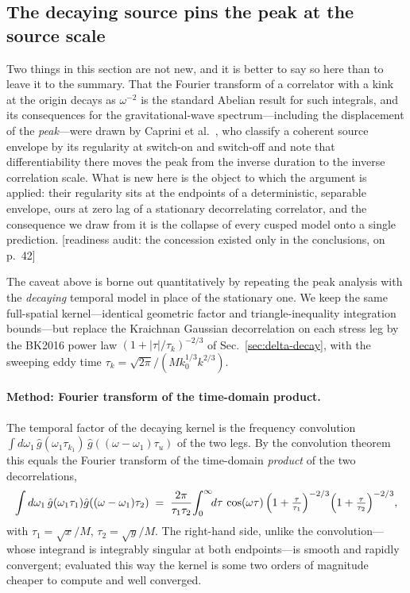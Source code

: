 \documentclass[10pt,prd,aps,nobibnotes,superscriptaddress,preprintnumbers,notitlepage]{revtex4-1}
\newcommand{\add}[1]{{\color{red}#1}}
\newcommand{\why}[1]{{\color{red}\footnotesize\textsf{[#1]}}}
\newcommand{\add}[1]{#1}
\newcommand{\why}[1]{}
\begin{document}
\subsection{The decaying source pins the peak at the source scale}
\label{sec:decaying-peak}

\add{Two things in this section are not new, and it is better to say so here than to
leave it to the summary. That the Fourier transform of a correlator with a kink at the
origin decays as $\omega^{-2}$ is the standard Abelian result for such integrals, and
its consequences for the gravitational-wave spectrum---including the displacement of the
\emph{peak}---were drawn by Caprini et al.~\cite{Caprini:2009fx}, who classify a
coherent source envelope by its regularity at switch-on and switch-off and note that
differentiability there moves the peak from the inverse duration to the inverse
correlation scale. What is new here is the object to which the argument is applied: their
regularity sits at the endpoints of a deterministic, separable envelope, ours at zero lag
of a stationary decorrelating correlator, and the consequence we draw from it is the
collapse of every cusped model onto a single prediction.}
\why{readiness audit: the concession existed only in the conclusions, on p.~42}

The caveat above is borne out quantitatively by repeating the peak analysis with
the \emph{decaying} temporal model in place of the stationary one. We keep the
same full-spatial kernel---identical geometric factor and triangle-inequality
integration bounds---but replace the Kraichnan Gaussian decorrelation on each
stress leg by the BK2016 power law $(1+|\tau|/\tau_k)^{-2/3}$ of
Sec.~\ref{sec:delta-decay}, with the sweeping eddy time
$\tau_k=\sqrt{2\pi}/(M k_0^{1/3}k^{2/3})$.

\paragraph{Method: Fourier transform of the time-domain product.}
The temporal factor of the decaying kernel is the frequency convolution
$\int d\omega_1\,\hat g(\omega_1\tau_{k_1})\,\hat g((\omega-\omega_1)\tau_u)$ of
the two legs. By the convolution theorem this equals the Fourier transform of the
time-domain \emph{product} of the two decorrelations,
\begin{equation}
  \int d\omega_1\,\hat g(\omega_1\tau_1)\hat g((\omega-\omega_1)\tau_2)
  \;=\;\frac{2\pi}{\tau_1\tau_2}\!\int_0^\infty\!\!d\tau\,\cos(\omega\tau)\,
  \Bigl(1+\tfrac{\tau}{\tau_1}\Bigr)^{-2/3}\Bigl(1+\tfrac{\tau}{\tau_2}\Bigr)^{-2/3},
  \label{eq:ft-of-product}
\end{equation}
with $\tau_1=\sqrt{x}/M$, $\tau_2=\sqrt{y}/M$. The right-hand side, unlike the
convolution---whose integrand is integrably singular at both endpoints---is smooth
and rapidly convergent; evaluated this way the kernel is some two orders of
magnitude cheaper to compute and well converged.
\end{document}
